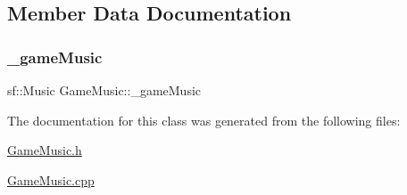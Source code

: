\subsection{Member Data Documentation}
\mbox{\label{class_game_music_a461fff6d2be45f65c7de7fdadcf0ae00}} 
\subsubsection{\texorpdfstring{\+\_\+game\+Music}{\_gameMusic}}
{\footnotesize\ttfamily sf\+::\+Music Game\+Music\+::\+\_\+game\+Music\hspace{0.3cm}{\ttfamily [private]}}



The documentation for this class was generated from the following files\+:\begin{DoxyCompactItemize}
\item 
\hyperlink{_game_music_8h}{Game\+Music.\+h}\item 
\hyperlink{_game_music_8cpp}{Game\+Music.\+cpp}\end{DoxyCompactItemize}

